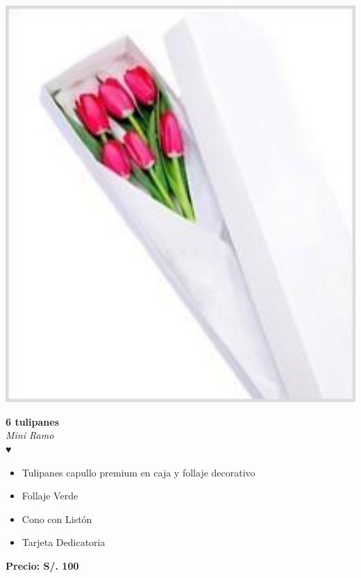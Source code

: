 \documentclass{article}
\begin{document}
\begin{minipage}{0.35\textwidth}
    \includegraphics[width=1.0\textwidth]{imagenes_extraidas/image_2_4}
\end{minipage}
\hspace{1cm}
\begin{minipage}{0.6\textwidth}
    \textcolor{cpred}{\textbf{\huge 6 tulipanes }}\\
    {\textit{Mini Ramo}} \\
    \textcolor{cpred}{\Huge ♥} \\
    \vspace{0.5cm}
    \begin{itemize}
        \item Tulipanes capullo premium en caja y follaje decorativo
        \item Follaje Verde
        \item Cono con Listón
        \item Tarjeta Dedicatoria
    \end{itemize}
\end{minipage}
\vspace{0.3cm}
\begin{center}
   \textbf{\Large Precio: \textcolor{cpred}{S/. 100 }}
\end{center}
\end{document}
